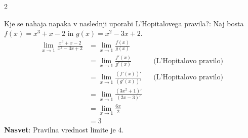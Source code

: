 \documentclass[11pt,a4paper]{exam}
\renewcommand{\{}{\lbrace}
\renewcommand{\}}{\rbrace}
\begin{document}
\begin{questions}
\begin{multicols}{2}
		\end{multicols}
	
		\question Kje se nahaja napaka v naslednji uporabi L'Hopitalovega pravila?:
		Naj bosta $f(x) = x^3 + x - 2$ in $g(x)=x^2 - 3x + 2$.
		\begin{align*}
			\lim_{x\to 1} \frac{x^3 + x - 2}{x^2 - 3x + 2} &= \lim_{x\to 1} \frac{f(x)}{g(x)}\\
			&= \lim_{x\to 1} \frac{f'(x)}{g'(x)} && \text{(L'Hopitalovo pravilo)} \\
			&= \lim_{x\to 1} \frac{(f'(x))'}{(g'(x))'} && \text{(L'Hopitalovo pravilo)} \\
			&=\lim_{x\to 1} \frac{(3x^2 + 1)'}{(2x - 3)'}\\
			&=\lim_{x\to 1} \frac{6x}{2} \\
			&=3
		\end{align*}
		\textbf{Nasvet}: Pravilna vrednost limite je $4$.



\end{questions}
\end{document}

